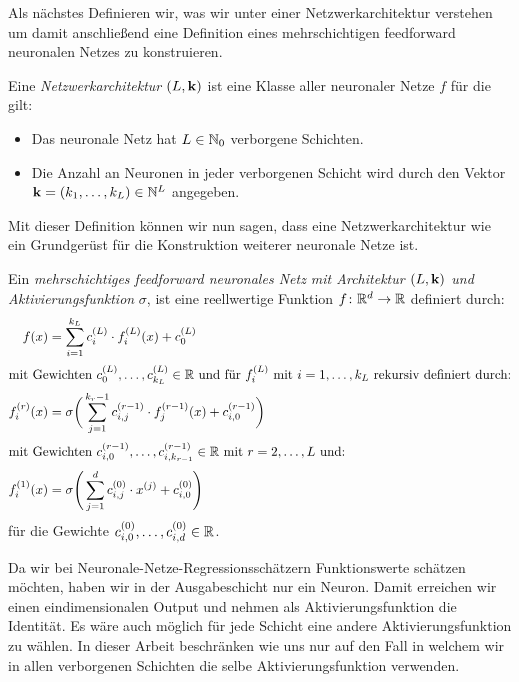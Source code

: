 Als nächstes Definieren wir, was wir unter einer Netzwerkarchitektur verstehen um damit anschließend eine Definition eines mehrschichtigen feedforward neuronalen Netzes zu konstruieren.
\begin{defn}
Eine \emph{Netzwerkarchitektur $(L, \mathbf{k})$} ist eine Klasse aller neuronaler Netze $f$ für die gilt:
\begin{itemize}
\item Das neuronale Netz hat $L \in \mathbb{N}_0$ verborgene Schichten.
\item Die Anzahl an Neuronen in jeder verborgenen Schicht wird durch den Vektor $\mathbf{k} = (k_1,\dots,k_L) \in \mathbb{N}^L$ angegeben.
\end{itemize}
Mit dieser Definition können wir nun sagen, dass eine Netzwerkarchitektur wie ein Grundgerüst für die Konstruktion weiterer neuronale Netze ist.
\end{defn}
\begin{defn}
\label{def:nn}
Ein \emph{mehrschichtiges feedforward neuronales Netz mit Architektur $(L, \mathbf{k})$ und Aktivierungsfunktion} $\sigma$, ist eine reellwertige Funktion $f\colon \mathbb{R}^d \to \mathbb{R}$ definiert durch:
\begin{align}
\label{networkarch}
f(x) & = \sum_{i = 1}^{k_L} c_i^{(L)} \cdot f_i^{(L)}(x) + c_0^{(L)} \nonumber \\
\intertext{mit Gewichten $c_0^{(L)},\dots,c_{k_L}^{(L)} \in \mathbb{R}$ und für $f_i^{(L)}$ mit $i = 1,\dots,k_L$ rekursiv definiert durch:} 
f_i^{(r)}(x) & = \sigma \bigg(\sum_{j = 1}^{k_r - 1} c_{i,j}^{(r - 1)} \cdot f_j^{(r - 1)}(x) + c_{i,0}^{(r - 1)} \bigg)\\
\intertext{mit Gewichten $c_{i,0}^{(r - 1)},\dots,c_{i,k_{r - 1}}^{(r - 1)} \in \mathbb{R}$ mit $r = 2,\dots, L$ und:}
f_i^{(1)}(x) & = \sigma \Bigg(\sum_{j = 1}^{d} c_{i,j}^{(0)} \cdot x^{(j)} + c_{i,0}^{(0)} \Bigg) \nonumber
\end{align} 
für die Gewichte $c_{i,0}^{(0)},\dots,c_{i,d}^{(0)} \in \mathbb{R}$.
\end{defn}
Da wir bei Neuronale-Netze-Regressionsschätzern Funktionswerte schätzen möchten, haben wir in der Ausgabeschicht nur ein Neuron. Damit erreichen wir einen eindimensionalen Output und nehmen als Aktivierungsfunktion die Identität.
Es wäre auch möglich für jede Schicht eine andere Aktivierungsfunktion zu wählen. In dieser Arbeit beschränken wie uns nur auf den Fall in welchem wir in allen verborgenen Schichten die selbe Aktivierungsfunktion verwenden.


